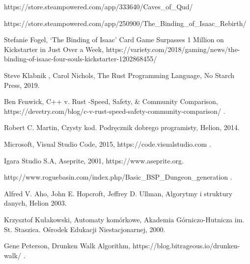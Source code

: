 \documentclass[12pt,twoside]{article}
\begin{document}
\begin{thebibliography}{4}
 https://store.steampowered.com/app/333640/Caves\_of\_Qud/


 https://store.steampowered.com/app/250900/The\_Binding\_of\_Isaac\_Rebirth/

 Stefanie Fogel, ‘The Binding of Isaac’ Card Game Surpasses 1 Million on Kickstarter in Just Over a Week, https://variety.com/2018/gaming/news/the-binding-of-isaac-four-souls-kickstarter-1202868455/


  Steve Klabnik , Carol Nichols, The Rust Programming Language, No Starch Press, 2019.

 Ben Fenwick, C++ v. Rust -Speed, Safety, \& Community Comparison, https://devetry.com/blog/c-v-rust-speed-safety-community-comparison/ .

 Robert C. Martin, Czysty kod. Podręcznik dobrego programisty, Helion, 2014.

 Microsoft, Visual Studio Code, 2015, https://code.visualstudio.com .

 Igara Studio S.A, Aseprite, 2001, https://www.aseprite.org.

 http://www.roguebasin.com/index.php/Basic\_BSP\_Dungeon\_generation .

 Alfred V. Aho, John E. Hopcroft, Jeffrey D. Ullman, Algorytmy i struktury danych, Helion 2003.

 Krzysztof Kułakowski, Automaty komórkowe, Akademia Górniczo-Hutnicza im. St. Staszica. Ośrodek Edukacji Niestacjonarnej, 2000.

 Gene Peterson, Drunken Walk Algorithm, https://blog.bitrageous.io/drunken-walk/ .

\end{thebibliography}

\clearpage

\makesummary
\end{document}
